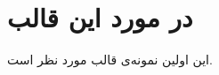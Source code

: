 \documentclass[12pt]{article}
\makeatletter
\let\thedate\@date
\makeatother
\begin{document}
\begin{titlepage}
    {\large \thedate}\\[2 cm]
 
    \vfill
    
\end{titlepage}


\tableofcontents
\pagebreak


\section{در مورد این قالب}
این اولین نمونه‌ی قالب مورد نظر است.
\newpage


\end{document}
